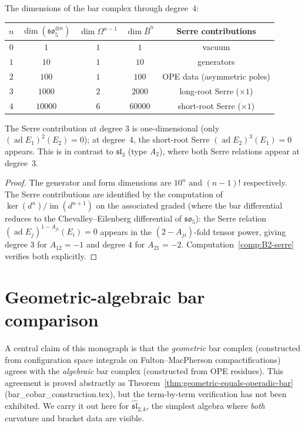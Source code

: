 \begin{proposition}
\label{prop:so5-bar-dims}
The dimensions of the bar complex through degree~4:
\begin{center}
\renewcommand{\arraystretch}{1.2}
\begin{tabular}{c|ccc|c}
$n$ & $\dim(\mathfrak{so}_5^{\otimes n})$ &
$\dim \Omega^{n-1}$ & $\dim \bar{B}^n$ & Serre contributions \\
\hline
$0$ & $1$ & $1$ & $1$ & vacuum \\
$1$ & $10$ & $1$ & $10$ & generators \\
$2$ & $100$ & $1$ & $100$ & OPE data (asymmetric poles) \\
$3$ & $1000$ & $2$ & $2000$ & long-root Serre ($\times 1$) \\
$4$ & $10000$ & $6$ & $60000$ & short-root Serre ($\times 1$)
\end{tabular}
\end{center}
The Serre contribution at degree 3 is one-dimensional (only
$(\operatorname{ad} E_1)^2(E_2) = 0$); at degree~4, the short-root
Serre $(\operatorname{ad} E_2)^3(E_1) = 0$ appears.  This is in
contrast to $\mathfrak{sl}_3$ (type $A_2$), where both Serre relations
appear at degree~3.
\end{proposition}

\begin{proof}
The generator and form dimensions are $10^n$ and $(n-1)!$ respectively.
The Serre contributions are identified by the computation of
$\ker(d^n)/\operatorname{im}(d^{n+1})$ on the associated graded (where
the bar differential reduces to the Chevalley--Eilenberg differential
of $\mathfrak{so}_5$): the Serre relation
$(\operatorname{ad} E_j)^{1-A_{ji}}(E_i) = 0$ appears in the
$(2 - A_{ji})$-fold tensor power, giving degree $3$ for $A_{12} = -1$
and degree $4$ for $A_{21} = -2$.
Computation~\ref{comp:B2-serre} verifies both explicitly.
\end{proof}


\section{Geometric-algebraic bar comparison}
\label{sec:geometric-algebraic-comparison}

A central claim of this monograph is that the \emph{geometric} bar
complex (constructed from configuration space integrals on
Fulton--MacPherson compactifications) agrees with the \emph{algebraic}
bar complex (constructed from OPE residues).  This agreement is
proved abstractly as
Theorem~\ref{thm:geometric-equals-operadic-bar}
(bar\_cobar\_construction.tex), but the term-by-term verification has
not been exhibited.  We carry it out here for
$\widehat{\mathfrak{sl}}_{2,k}$, the simplest algebra where \emph{both}
curvature and bracket data are visible.

